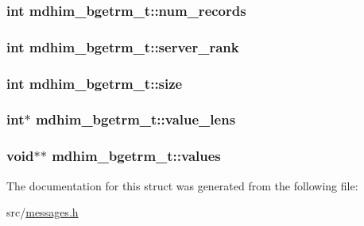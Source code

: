 \hypertarget{structmdhim__bgetrm__t_a3d398b31f450603e67b854ab563180e8}{
\subsubsection[{num\-\_\-records}]{\setlength{\rightskip}{0pt plus 5cm}int mdhim\-\_\-bgetrm\-\_\-t\-::num\-\_\-records}}\label{structmdhim__bgetrm__t_a3d398b31f450603e67b854ab563180e8}
\hypertarget{structmdhim__bgetrm__t_a3113667adc0eafe85d22c273766bce7f}{
\subsubsection[{server\-\_\-rank}]{\setlength{\rightskip}{0pt plus 5cm}int mdhim\-\_\-bgetrm\-\_\-t\-::server\-\_\-rank}}\label{structmdhim__bgetrm__t_a3113667adc0eafe85d22c273766bce7f}
\hypertarget{structmdhim__bgetrm__t_a18bb77da1f9fa807514b7449057157f4}{
\subsubsection[{size}]{\setlength{\rightskip}{0pt plus 5cm}int mdhim\-\_\-bgetrm\-\_\-t\-::size}}\label{structmdhim__bgetrm__t_a18bb77da1f9fa807514b7449057157f4}
\hypertarget{structmdhim__bgetrm__t_add99791a3bc82e16120388d1dc0f3ba7}{
\subsubsection[{value\-\_\-lens}]{\setlength{\rightskip}{0pt plus 5cm}int$\ast$ mdhim\-\_\-bgetrm\-\_\-t\-::value\-\_\-lens}}\label{structmdhim__bgetrm__t_add99791a3bc82e16120388d1dc0f3ba7}
\hypertarget{structmdhim__bgetrm__t_a322850d7fda46b0c170ca98342a81779}{
\subsubsection[{values}]{\setlength{\rightskip}{0pt plus 5cm}void$\ast$$\ast$ mdhim\-\_\-bgetrm\-\_\-t\-::values}}\label{structmdhim__bgetrm__t_a322850d7fda46b0c170ca98342a81779}


The documentation for this struct was generated from the following file\-:\begin{DoxyCompactItemize}
\item 
src/\hyperlink{messages_8h}{messages.\-h}\end{DoxyCompactItemize}
